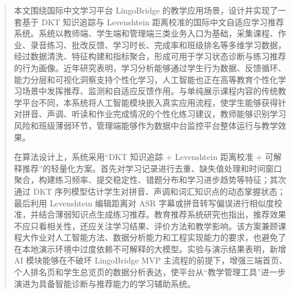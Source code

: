 
\begin{abstract}
本文围绕国际中文学习平台 LingoBridge 的教学应用场景，设计并实现了一套基于 DKT 知识追踪与 Levenshtein 距离校准的国际中文自适应学习推荐系统。系统以教师端、学生端和管理端三类业务入口为基础，采集课程、作业、录音练习、批改反馈、学习时长、完成率和班级排名等多维学习数据，经过数据清洗、特征构建和指标聚合，形成可用于学习状态诊断与练习推荐的行为画像。近年研究表明，学习分析能够通过学生行为数据、反馈循环、能力分层和可视化洞察支持个性化学习，人工智能也正在高等教育个性化学习场景中发挥推荐、监测和自适应反馈作用\cite{Ref-LearningAnalyticsPersonalized2024,Ref-AIPersonalizedLearningHE2025}。与单纯展示课程内容的传统教学平台不同，本系统将人工智能模块嵌入真实应用流程，使学生能够获得针对拼音、声调、听读和作业完成情况的个性化练习建议，教师能够识别学习风险和班级薄弱环节，管理端能够作为数据中台监控平台整体运行与教学效果。

在算法设计上，系统采用“DKT 知识追踪 + Levenshtein 距离校准 + 可解释推荐”的轻量化方案。首先对学习记录进行去重、缺失值处理和时间窗口聚合，构建练习频率、提交稳定性、错题分布和学习进步趋势等特征；其次通过 DKT 序列模型估计学生对拼音、声调和词汇知识点的动态掌握状态；最后利用 Levenshtein 编辑距离对 ASR 字幕或拼音转写偏误进行相似度校准，并结合薄弱知识点生成练习推荐。教育推荐系统研究也指出，推荐效果不应只看相关性，还应关注学习结果、评价方法和教学影响\cite{Ref-EducationalRecommenderEvaluation2024}。该方案兼顾课程大作业对人工智能方法、数据分析能力和工程实现能力的要求，也避免了在本地演示环境中过度依赖不可解释的大模型。实验与演示结果表明，新增 AI 模块能够在不破坏 LingoBridge MVP 主流程的前提下，增强三端首页、个人排名页和学生总览页的数据分析表达，使平台从“教学管理工具”进一步演进为具备智能诊断与推荐能力的学习辅助系统。  
\end{abstract}

